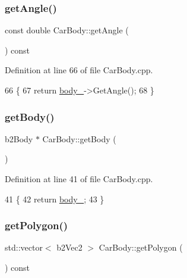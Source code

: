 \subsubsection{\texorpdfstring{get\+Angle()}{getAngle()}}
{\footnotesize\ttfamily const double Car\+Body\+::get\+Angle (\begin{DoxyParamCaption}{ }\end{DoxyParamCaption}) const}



Definition at line 66 of file Car\+Body.\+cpp.


\begin{DoxyCode}
66                                      \{
67     \textcolor{keywordflow}{return} \hyperlink{classCarBody_aa460930fa1548d1987051dfa6f68c897}{body\_}->GetAngle();
68 \}
\end{DoxyCode}
\mbox{\label{classCarBody_abf98252ba6d666ce771acfdf7c6d66cb}} 
\subsubsection{\texorpdfstring{get\+Body()}{getBody()}}
{\footnotesize\ttfamily b2\+Body $\ast$ Car\+Body\+::get\+Body (\begin{DoxyParamCaption}{ }\end{DoxyParamCaption})}



Definition at line 41 of file Car\+Body.\+cpp.


\begin{DoxyCode}
41                          \{
42     \textcolor{keywordflow}{return} \hyperlink{classCarBody_aa460930fa1548d1987051dfa6f68c897}{body\_};
43 \}
\end{DoxyCode}
\mbox{\label{classCarBody_ad446bb563f4475c59d28054bbe886a9d}} 
\subsubsection{\texorpdfstring{get\+Polygon()}{getPolygon()}}
{\footnotesize\ttfamily std\+::vector$<$ b2\+Vec2 $>$ Car\+Body\+::get\+Polygon (\begin{DoxyParamCaption}{ }\end{DoxyParamCaption}) const}



